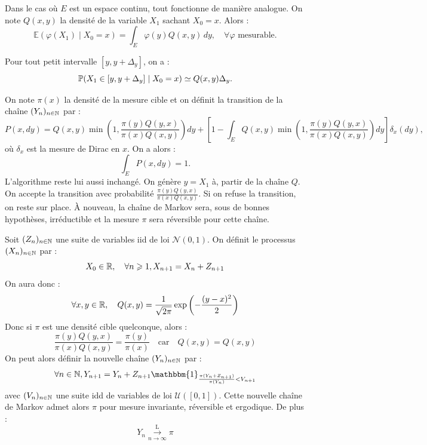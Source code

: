 \begin{proposition}
    Dans le cas où $E$ est un espace continu, tout fonctionne de manière analogue.  
    On note $Q(x,y)$ la densité de la variable $X_1$ sachant $X_0 = x$. Alors :
        \[
            \mathbb{E}(\varphi(X_1) \mid X_0 = x) = \int_E \varphi(y) Q(x,y) \, dy, \quad \forall \varphi \text{ mesurable}.
        \]

    Pour tout petit intervalle $[y, y+\Delta_y]$, on a :
        \[
            \mathbb{P}(X_1 \in [y, y+\Delta_y] \mid X_0 = x) \simeq Q(x,y) \Delta_y.
        \]

    On note $\pi(x)$ la densité de la mesure cible et on définit la transition de la chaîne $(Y_n)_{n \in \mathbb{N}}$ par :
        \[
            P(x,dy) = Q(x,y) \min\left(1, \frac{\pi(y) Q(y,x)}{\pi(x) Q(x,y)}\right) dy
            + \left[1 - \int_E Q(x,y) \min\left(1, \frac{\pi(y) Q(y,x)}{\pi(x) Q(x,y)}\right) dy \right] \delta_x(dy),
        \]
    où $\delta_x$ est la mesure de Dirac en $x$.  
    On a alors :
        \[
            \int_E P(x,dy) = 1.
        \]
    L'algorithme reste lui aussi inchangé. On génère $y = X_1$ à, partir de la chaîne $Q$. On accepte la transition 
    avec probabilité $\frac{\pi(y) Q(y,x)}{\pi(x) Q(x,y)}$. Si on refuse la transition, on reste sur place. 
    À nouveau, la chaîne de Markov sera, sous de bonnes hypothèses, irréductible et la mesure $ \pi$ sera réversible 
    pour cette chaîne. 
\end{proposition}

\begin{example}
    Soit $(Z_n)_{n \in \mathbb{N}}$ une suite de variables iid de loi $ \mathcal{N}(0,1)$. On définit 
    le processus $(X_n)_{n \in \mathbb{N}}$ par : 
        $$ X_0 \in \mathbb{R}, \quad \forall n \geqslant 1, X_{n+1} = X_n + Z_{n+1} $$ 
    On aura donc : 
        $$ \forall x,y \in \mathbb{R}, \quad Q(x,y) = \frac{1}{\sqrt{2 \pi}} \exp \left( - \frac{(y-x)^2}{2}\right) $$ 
    Donc si $ \pi$ est une densité cible quelconque, alors : 
        $$ \frac{\pi(y) Q(y,x)}{\pi(x) Q(x,y)} = \frac{ \pi(y)}{ \pi(x)} \quad \text{car} \quad Q(x,y) = Q(x,y) $$ 
    On peut alors définir la nouvelle chaîne $(Y_n)_{n \in \mathbb{N}}$ par : 
        $$ \forall n \in \N, Y_{n+1} = Y_n + Z_{n+1} \mathbbm{1}_{ \frac{ \pi(Y_n + Z_{n+1})}{ \pi(Y_n)} < V_{n+1}} $$ 
    avec $(V_n)_{n \in \mathbb{N}}$ une suite idd de variables de loi $ \mathcal{U}([0,1])$. Cette nouvelle 
    chaîne de Markov admet alors $ \pi$ pour mesure invariante, réversible et ergodique. 
    De plus : 
        $$ Y_n \overset{\text{L}}{ \underset{n \to \infty}{\longrightarrow} } \pi $$ 
\end{example}

